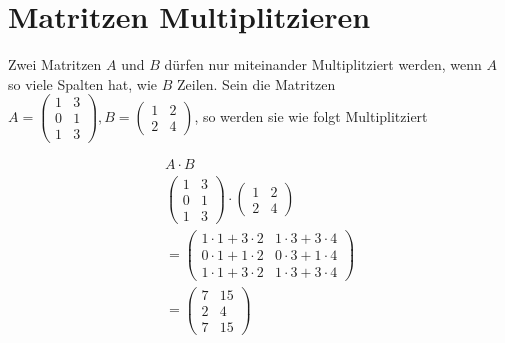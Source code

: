 \chapter{Matritzen Multiplitzieren}
\label{matrix_multiplitzieren}

Zwei Matritzen $A$ und $B$ dürfen nur miteinander Multiplitziert werden, wenn $A$ so viele Spalten hat, wie $B$ Zeilen. Sein die Matritzen $A = \begin{pmatrix}
    1 & 3 \\
    0 & 1 \\
    1 & 3
\end{pmatrix}, B = \begin{pmatrix}
    1 & 2 \\
    2 & 4
\end{pmatrix}$, so werden sie wie folgt Multiplitziert

\begin{align*}
    A \cdot B \\
    \begin{pmatrix}
        1 & 3 \\
        0 & 1 \\
        1 & 3
    \end{pmatrix} \cdot \begin{pmatrix}
        1 & 2 \\
        2 & 4
    \end{pmatrix} \\
    = \begin{pmatrix}
        1 \cdot 1 + 3 \cdot 2 & 1 \cdot 3 + 3 \cdot 4 \\
        0 \cdot 1 + 1 \cdot 2 & 0 \cdot 3 + 1 \cdot 4 \\
        1 \cdot 1 + 3 \cdot 2 & 1 \cdot 3 + 3 \cdot 4
    \end{pmatrix} \\
    = \begin{pmatrix}
        7 & 15 \\
        2 & 4 \\
        7 & 15
    \end{pmatrix}
\end{align*}